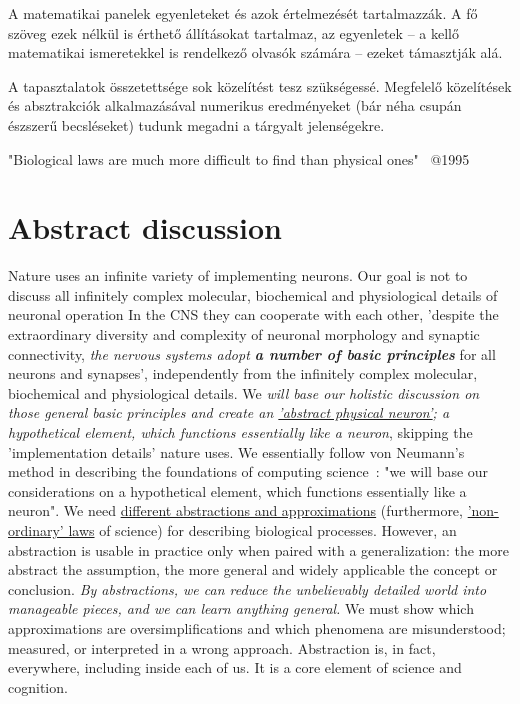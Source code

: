 {
A matematikai panelek egyenleteket és azok értelmezését tartalmazzák. A fő szöveg ezek nélkül is érthető állításokat tartalmaz, az egyenletek -- a kellő matematikai ismeretekkel
is rendelkező olvasók számára -- ezeket támasztják alá.
}


{
A tapasztalatok összetettsége sok  közelítést tesz szükségessé.
Megfelelő közelítések és absztrakciók alkalmazásával
numerikus eredményeket (bár néha csupán észszerű becsléseket)
tudunk megadni a tárgyalt jelenségekre.
}


\quotationbox
{
"Biological laws are much more difficult to find than physical ones"~\cite{VollmerLimitsOfBiology:1995} @1995
}




\section[Abstract discussion]{Abstract discussion\label{sec:Intro-Abstract}}

Nature uses an infinite variety of implementing neurons. 
Our goal is not to discuss all
infinitely complex molecular, biochemical and physiological details
of neuronal operation
In the \gls{CNS} 
they can cooperate
with each other, 'despite the extraordinary diversity and complexity of neuronal morphology and synaptic connectivity,
\textit{the nervous systems adopt \textbf{a number of
 basic principles}}
for all neurons and synapses',
\cite{JohnstonWuNeurophysiology:1995}
independently from the infinitely complex molecular, biochemical and physiological details.
We \textit{will base our holistic discussion on those general basic principles 
and create an 
\hyperlink{NeuronPhysical}
{'abstract physical neuron'}; a hypothetical element, which functions
essentially like a neuron},
skipping the 'implementation details' nature uses.
We essentially follow von Neumann's method in describing the foundations of
computing science~\cite{EDVACreport1945}: "we will base our considerations on a hypothetical element, which functions essentially like a neuron".
We need \hyperlink{Abstractions}
{different abstractions and approximations} 
(furthermore, \hyperlink{NonOrdinaryLaws}{'non-ordinary' laws} of science) for describing biological processes.
However, an abstraction is usable
in practice only when paired with a generalization: the more abstract the assumption, the more general and widely applicable the concept or conclusion.
\textit{By abstractions, we can reduce the unbelievably detailed world into manageable pieces, and we can learn anything general.}
We must show which approximations are oversimplifications and which phenomena are misunderstood; measured, or interpreted in a wrong approach.
Abstraction is, in fact, everywhere, including inside each of us. It is a core element of science and cognition. 

